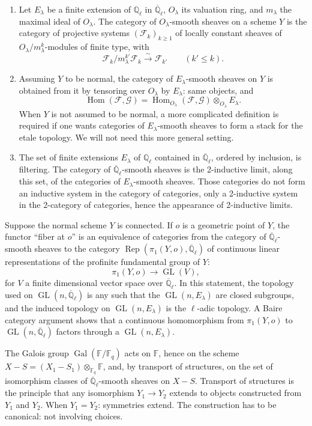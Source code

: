 \documentclass[10pt]{article}
\newcommand{\Fq}{\mathbb F_q}
\newcommand{\Fb}{\mathbb F}
\newcommand{\Ql}{\overline{\mathbb Q}_{\ell}}
\newcommand{\GL}{\operatorname{GL}}
\newcommand{\Rep}{\operatorname{Rep}}
\newcommand{\Gal}{\operatorname{Gal}}
\newcommand{\Hom}{\operatorname{Hom}}
\theoremstyle{deligne}
\newcommand{\heading}[1]{\vspace{0.7em}\noindent{\bfseries #1}\quad}
\begin{document}
\begin{enumerate}[label=\alph*)]
\item Let $E_\lambda$ be a finite extension of $\mathbb Q_\ell$ in $\Ql$, $O_\lambda$ its valuation ring, and $m_\lambda$ the maximal ideal of $O_\lambda$. The category of $O_\lambda$-smooth sheaves on a scheme $Y$ is the category of projective systems $(\mathcal F_k)_{k\ge1}$ of locally constant sheaves of $O_\lambda/m_\lambda^k$-modules of finite type, with
\[
 \mathcal F_k/m_\lambda^{k'}\mathcal F_k\overset{\sim}{\longrightarrow}\mathcal F_{k'}
 \qquad(k'\le k).
\]
\item Assuming $Y$ to be normal, the category of $E_\lambda$-smooth sheaves on $Y$ is obtained from it by tensoring over $O_\lambda$ by $E_\lambda$: same objects, and
\[
 \Hom(\mathcal F,\mathcal G)=\Hom_{O_\lambda}(\mathcal F,\mathcal G)\otimes_{O_\lambda}E_\lambda.
\]
When $Y$ is not assumed to be normal, a more complicated definition is required if one wants categories of $E_\lambda$-smooth sheaves to form a stack for the etale topology. We will not need this more general setting.
\item The set of finite extensions $E_\lambda$ of $\mathbb Q_\ell$ contained in $\Ql$, ordered by inclusion, is filtering. The category of $\Ql$-smooth sheaves is the 2-inductive limit, along this set, of the categories of $E_\lambda$-smooth sheaves. Those categories do not form an inductive system in the category of categories, only a 2-inductive system in the 2-category of categories, hence the appearance of 2-inductive limits.
\end{enumerate}

Suppose the normal scheme $Y$ is connected. If $o$ is a geometric point of $Y$, the functor ``fiber at $o$'' is an equivalence of categories from the category of $\Ql$-smooth sheaves to the category $\Rep(\pi_1(Y,o),\Ql)$ of continuous linear representations of the profinite fundamental group of $Y$:
\[
 \pi_1(Y,o)\longrightarrow\GL(V),
\]
for $V$ a finite dimensional vector space over $\Ql$. In this statement, the topology used on $\GL(n,\Ql)$ is any such that the $\GL(n,E_\lambda)$ are closed subgroups, and the induced topology on $\GL(n,E_\lambda)$ is the $\ell$-adic topology. A Baire category argument shows that a continuous homomorphism from $\pi_1(Y,o)$ to $\GL(n,\Ql)$ factors through a $\GL(n,E_\lambda)$.

\heading{1.2.} The Galois group $\Gal(\Fb/\Fq)$ acts on $\Fb$, hence on the scheme $X-S=(X_1-S_1)\otimes_{\Fq}\Fb$, and, by transport of structures, on the set of isomorphism classes of $\Ql$-smooth sheaves on $X-S$. Transport of structures is the principle that any isomorphism $Y_1\to Y_2$ extends to objects constructed from $Y_1$ and $Y_2$. When $Y_1=Y_2$: symmetries extend. The construction has to be canonical: not involving choices.
\end{document}
